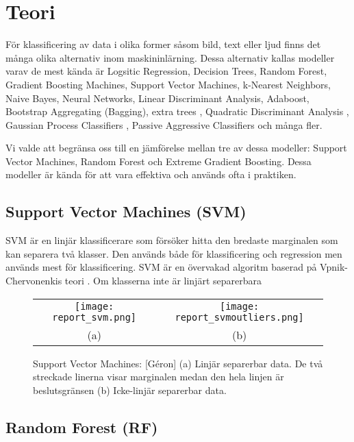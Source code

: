 \documentclass[12pt,a4paper]{article}
\begin{document}
\section{Teori}

För klassificering av data i olika former såsom bild, text eller ljud finns det många olika alternativ inom maskininlärning. Dessa alternativ kallas modeller varav de mest kända är Logsitic Regression, Decision Trees, Random Forest, Gradient Boosting Machines, Support Vector Machines, k-Nearest Neighbors, Naive Bayes, Neural Networks, Linear Discriminant Analysis, Adaboost, Bootstrap Aggregating (Bagging), extra trees \citep{Geron}, Quadratic Discriminant Analysis \citep{Bishop}, Gaussian Process Classifiers \citep{Gibbs}, Passive Aggressive Classifiers \citep{Crammer} och många fler.

Vi valde att begränsa oss till en jämförelse mellan tre av dessa modeller: Support Vector Machines, Random Forest och Extreme Gradient Boosting. Dessa modeller är kända för att vara effektiva och används ofta i praktiken.

\subsection{Support Vector Machines (SVM)}

SVM är en linjär klassificerare som försöker hitta den bredaste marginalen som kan separera två klasser. Den används både för klassificering och regression men används mest för klassificering. SVM är en övervakad algoritm baserad på Vpnik-Chervonenkis teori \citep{Duda}. Om klasserna inte är linjärt separerbara 

\begin{figure}[t]
  \centering
  \begin{tabular}{cc}
      \texttt{[image: report\_svm.png]} & 
      \texttt{[image: report\_svmoutliers.png]} \\
      (a) & (b) \\
  \end{tabular}
  \caption{\footnotesize{Support Vector Machines: [G\'eron] (a) Linjär separerbar data. De två streckade linerna visar marginalen medan den hela linjen är beslutsgränsen (b) Icke-linjär separerbar data.}}
  \label{fig:svm}
\end{figure}

\subsection{Random Forest (RF)}
\end{document}
